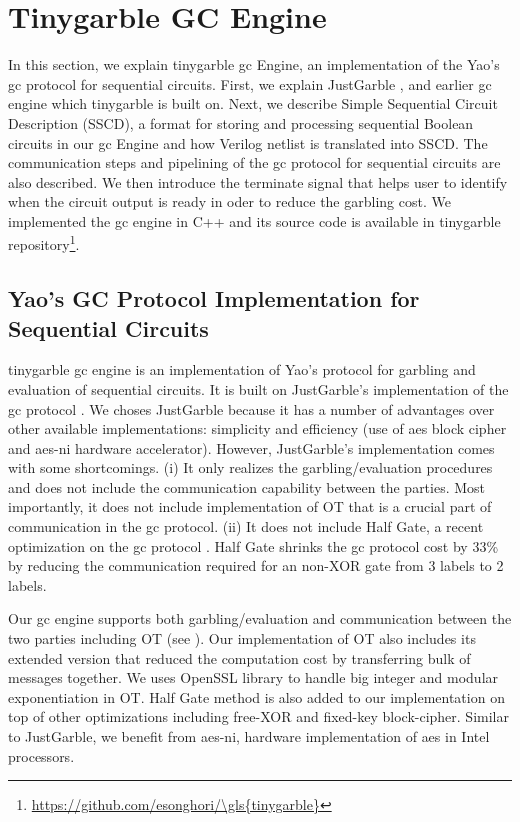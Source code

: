 \chapter{Tinygarble GC Engine}\label{chap:engine}
In this section, we explain \gls{tinygarble} \acrshort{gc} Engine, an implementation of the Yao's \acrshort{gc} protocol for sequential circuits.
First, we explain JustGarble \cite{bellare2013efficient}, and earlier \acrshort{gc} engine which \gls{tinygarble} is built on. 
Next, we describe Simple Sequential Circuit Description (SSCD), a format for storing and processing sequential Boolean circuits in our \acrshort{gc} Engine and how Verilog netlist is translated into SSCD.
The communication steps and pipelining of the \acrshort{gc} protocol for sequential circuits are also described.
We then introduce the terminate signal that helps user to identify when the circuit output is ready in oder to reduce the garbling cost.
We implemented the \acrshort{gc} engine in C++ and its source code is available in \gls{tinygarble} repository\footnote{\url{https://github.com/esonghori/\gls{tinygarble}}}.

\section{Yao's GC Protocol Implementation for Sequential Circuits} \label{sec:engine-gc}
\gls{tinygarble} \acrshort{gc} engine is an implementation of Yao's protocol for garbling and evaluation of sequential circuits.
It is built on JustGarble's implementation of the \acrshort{gc} protocol \cite{bellare2013efficient}.
We choses JustGarble because it has a number of advantages over other available implementations: simplicity and efficiency (use of \acrshort{aes} block cipher and \acrshort{aes-ni} hardware accelerator).
However, JustGarble's implementation comes with some shortcomings.
(i) It only realizes the garbling/evaluation procedures and does not include the communication capability between the parties.
Most importantly, it does not include implementation of OT that is a crucial part of communication in the \acrshort{gc} protocol.
(ii) It does not include Half Gate, a recent optimization on the \acrshort{gc} protocol \cite{zahur2015two}.
Half Gate shrinks the \acrshort{gc} protocol cost by 33\% by reducing the communication required for an non-XOR gate from 3 labels to 2 labels.

Our \acrshort{gc} engine supports both garbling/evaluation and communication between the two parties including OT (see ).
Our implementation of OT also includes its extended version \cite{husted2013gpu} that reduced the computation cost by transferring bulk of messages together.
We uses OpenSSL library to handle big integer and modular exponentiation in OT.
Half Gate method is also added to our implementation on top of other optimizations including free-XOR and fixed-key block-cipher.
Similar to JustGarble, we benefit from \acrshort{aes-ni}, hardware implementation of \acrshort{aes} in Intel processors.

